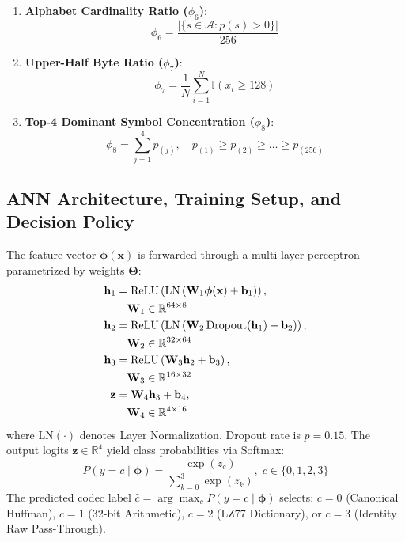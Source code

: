 \documentclass[conference]{IEEEtran}
\begin{document}
\begin{enumerate}
    \item \textbf{Alphabet Cardinality Ratio ($\phi_6$)}:
    \begin{equation}
        \phi_6 = \frac{|\{s \in \mathcal{A} : p(s) > 0\}|}{256}
    \end{equation}
    
    \item \textbf{Upper-Half Byte Ratio ($\phi_7$)}:
    \begin{equation}
        \phi_7 = \frac{1}{N} \sum_{i=1}^N \mathbb{I}(x_i \ge 128)
    \end{equation}
    
    \item \textbf{Top-4 Dominant Symbol Concentration ($\phi_8$)}:
    \begin{equation}
        \phi_8 = \sum_{j=1}^4 p_{(j)}, \quad p_{(1)} \ge p_{(2)} \ge \dots \ge p_{(256)}
    \end{equation}
\end{enumerate}

\subsection{ANN Architecture, Training Setup, and Decision Policy}
\label{subsec:ann_model}
The feature vector $\bm{\phi}(\mathbf{x})$ is forwarded through a multi-layer perceptron parametrized by weights $\bm{\Theta}$:
\begin{align}
    \mathbf{h}_1 &= \text{ReLU}\left(\text{LN}\left(\mathbf{W}_1 \bm{\phi}(\mathbf{x}) + \mathbf{b}_1\right)\right), \notag \\
    &\quad \mathbf{W}_1 \in \mathbb{R}^{64 \times 8} \\
    \mathbf{h}_2 &= \text{ReLU}\left(\text{LN}\left(\mathbf{W}_2 \,\text{Dropout}(\mathbf{h}_1) + \mathbf{b}_2\right)\right), \notag \\
    &\quad \mathbf{W}_2 \in \mathbb{R}^{32 \times 64} \\
    \mathbf{h}_3 &= \text{ReLU}\left(\mathbf{W}_3 \mathbf{h}_2 + \mathbf{b}_3\right), \notag \\
    &\quad \mathbf{W}_3 \in \mathbb{R}^{16 \times 32} \\
    \mathbf{z} &= \mathbf{W}_4 \mathbf{h}_3 + \mathbf{b}_4, \notag \\
    &\quad \mathbf{W}_4 \in \mathbb{R}^{4 \times 16}
\end{align}
where $\text{LN}(\cdot)$ denotes Layer Normalization. Dropout rate is $p = 0.15$. The output logits $\mathbf{z} \in \mathbb{R}^4$ yield class probabilities via Softmax:
\begin{equation}
    P(y = c \mid \bm{\phi}) = \frac{\exp(z_c)}{\sum_{k=0}^3 \exp(z_k)}, \; c \in \{0, 1, 2, 3\}
\end{equation}
The predicted codec label $\hat{c} = \arg\max_c P(y = c \mid \bm{\phi})$ selects: $c=0$ (Canonical Huffman), $c=1$ (32-bit Arithmetic), $c=2$ (LZ77 Dictionary), or $c=3$ (Identity Raw Pass-Through).
\end{document}
